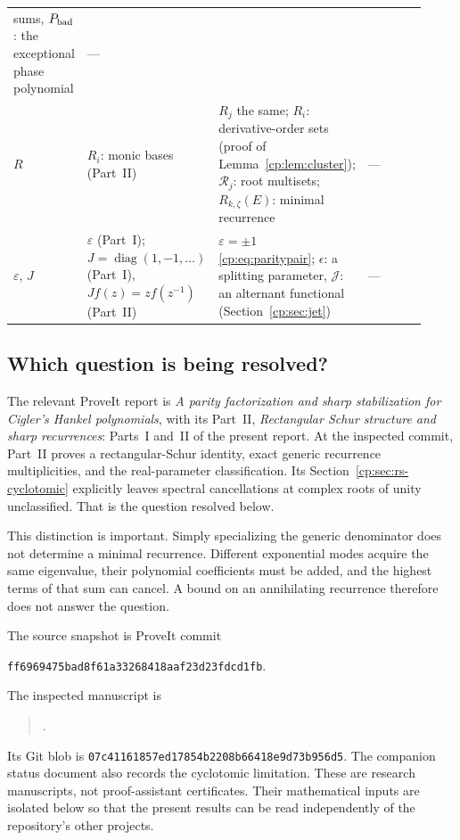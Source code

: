 \documentclass[11pt]{article}
\theoremstyle{definition}
\theoremstyle{remark}
\newcommand{\diag}{\operatorname{diag}}
\newcommand{\eps}{\varepsilon}
\newcommand{\pinIII}{ff6969475bad8f61a33268418aaf23d23fdcd1fb}
\theoremstyle{definition}
\theoremstyle{plain}
\numberwithin{equation}{section}
\begin{document}
{\begin{longtable}{@{}>{\raggedright\arraybackslash}p{0.10\linewidth}>{\raggedright\arraybackslash}p{0.27\linewidth}>{\raggedright\arraybackslash}p{0.31\linewidth}>{\raggedright\arraybackslash}p{0.24\linewidth}@{}}
sums, $P_{\rm bad}$: the exceptional phase polynomial &
---\\[3pt]
$R$ &
$R_i$: monic bases (Part~II) &
$R_j$ the same; $R_i$: derivative-order sets (proof of
Lemma~\ref{cp:lem:cluster}); $\mathcal R_j$: root multisets;
$R_{k,\zeta}(E)$: minimal recurrence &
---\\[3pt]
$\varepsilon$, $J$ &
$\eps$ (Part~I); $J=\diag(1,-1,\ldots)$ (Part~I), $Jf(z)=zf(z^{-1})$
(Part~II) &
$\varepsilon=\pm1$ \eqref{cp:eq:paritypair}; $\epsilon$: a splitting
parameter, $\mathcal J$: an alternant functional
(Section~\ref{cp:sec:jet}) &
---\\
\bottomrule
\end{longtable}}

\subsection{Which question is being resolved?}
\label{cp:sec:question}
The relevant ProveIt report is \emph{A parity factorization and sharp
stabilization for Cigler's Hankel polynomials}, with its Part~II,
\emph{Rectangular Schur structure and sharp recurrences}: Parts~I and~II
of the present report.
At the inspected commit, Part~II proves a rectangular-Schur identity, exact
generic recurrence multiplicities, and the real-parameter classification.
Its Section~\ref{cp:sec:rs-cyclotomic} explicitly leaves spectral cancellations at complex roots of
unity unclassified. That is the question resolved below.

This distinction is important. Simply specializing the generic denominator
does not determine a minimal recurrence. Different exponential modes acquire
the same eigenvalue, their polynomial coefficients must be added, and the
highest terms of that sum can cancel. A bound on an annihilating recurrence
therefore does not answer the question.

The source snapshot is ProveIt commit
\begin{center}\small\texttt{\pinIII}.\end{center}
The inspected manuscript is
\begin{quote}\small{}.
\end{quote}
Its Git blob is \texttt{07c41161857ed17854b2208b66418e9d73b956d5}.
The companion status document also records the cyclotomic limitation.
These are research manuscripts, not proof-assistant certificates. Their
mathematical inputs are isolated below so that the present results can be
read independently of the repository's other projects.
\end{document}
